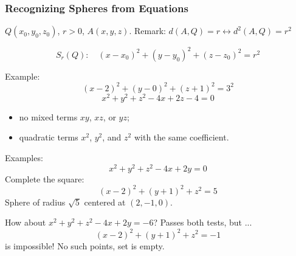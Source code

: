 \begin{frame}
 \frametitle{Recognizing Spheres from Equations}

  $Q(x_0,y_0,z_0)$, $r>0$, $A(x,y,z)$. Remark: $d(A,Q) = r \longleftrightarrow d^2(A,Q) = r^2$

$$S_r(Q): \quad (x-x_0)^2+(y-y_0)^2+(z-z_0)^2 = r^2$$

\pause
Example:
$$(x-2)^2+(y-0)^2+(z+1)^2=3^2$$
%
$$x^2+y^2+z^2 -4x + 2z -4=0$$

\pause
\begin{itemize}
 \item no mixed terms $xy$, $xz$, or $yz$;
 \item quadratic terms $x^2$, $y^2$, and $z^2$ with the same coefficient.
\end{itemize}

\pause
Examples:
$$x^2+y^2+z^2-4x+2y=0$$
%
\pause
Complete the square:
%
$$(x-2)^2 + (y+1)^2 +z^2 = 5$$
%
Sphere of radius $\sqrt{5}$ centered at $(2,-1,0)$.

\pause
How about $x^2+y^2+z^2 - 4x+2y = -6$? \pause Passes both tests, but ...
%
$$(x-2)^2 + (y+1)^2 +z^2 = -1$$
%
is impossible! No such points, set is empty.

\end{frame}